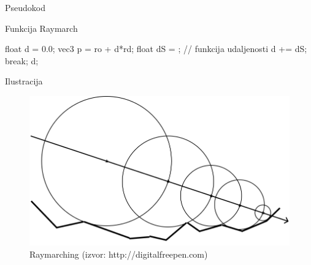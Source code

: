 \documentclass[12pt]{beamer}
\begin{document}
  \begin{frame}{Pseudokod}
    \begin{algorithm}[H]
      \caption{Funkcija Raymarch}
      \begin{algorithmic}[1]
          \State float d = 0.0;
            \State vec3 p = ro + d*rd;
            \State float dS = ; // funkcija udaljenosti
            \State d += dS;
              \State break;
            \EndIf
          \EndFor
          \State \Return d;
        \EndFunction
      \end{algorithmic}
      \label{alg:raymarch}
    \end{algorithm}
  \end{frame}

  \begin{frame}{Ilustracija}
    \begin{figure}
      \includegraphics[width=\textwidth,height=\textheight,keepaspectratio]{raymarch.png}
      \caption{Raymarching (izvor: http://digitalfreepen.com)}
    \end{figure}
  \end{frame}
\end{document}
